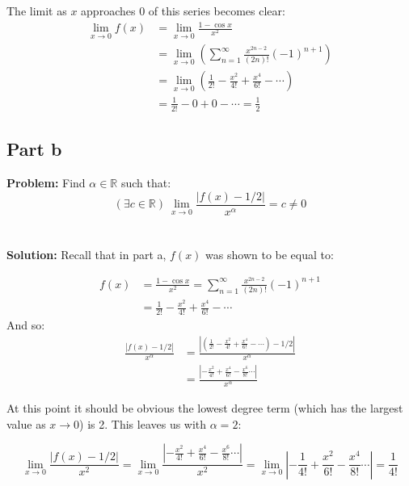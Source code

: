 \documentclass{article}
\begin{document}
The limit as $x$ approaches 0 of this series becomes clear:
\begin{align*}
\lim_{x\to 0}f(x)&=\lim_{x\to 0}\frac{1-\cos x}{x^2}\\
&=\lim_{x\to 0}\left(\sum_{n=1}^\infty\frac{x^{2n-2}}{(2n)!}(-1)^{n+1}\right)\\
&=\lim_{x\to 0}\left(\frac{1}{2!}-\frac{x^2}{4!}+\frac{x^4}{6!}-\cdots\right)\\
&=\frac{1}{2!}-0+0-\cdots=\frac{1}{2}
\end{align*}

\subsection*{Part b}
\textbf{Problem:} Find $\alpha\in\mathbb R$ such that:
$$(\exists c\in\mathbb R)\ \lim_{x\to0}\frac{|f(x)-1/2|}{x^\alpha}=c\not=0$$
\\\\
\textbf{Solution:} Recall that in part a, $f(x)$ was shown to be equal to:

\begin{align*}
  f(x)&=\frac{1-\cos x}{x^2}=\sum_{n=1}^\infty \frac{x^{2n-2}}{(2n)!}(-1)^{n+1}\\
  &=\frac{1}{2!}-\frac{x^2}{4!}+\frac{x^4}{6!}-\cdots
\end{align*}
And so:
\begin{align*}
  \frac{|f(x)-1/2|}{x^\alpha}&=\frac{\left|\left(\frac{1}{2!}-\frac{x^2}{4!}+\frac{x^4}{6!}-\cdots\right)-1/2\right|}{x^\alpha}\\
  &=\frac{\left|-\frac{x^2}{4!}+\frac{x^4}{6!}-\frac{x^6}{8!}\cdots\right|}{x^\alpha}
\end{align*}

At this point it should be obvious the lowest degree term (which has the largest value as $x\to 0$) is 2. This leaves us with $\alpha=2$:

$$\lim_{x\to0}\frac{|f(x)-1/2|}{x^2}=\lim_{x\to0}\frac{\left|-\frac{x^2}{4!}+\frac{x^4}{6!}-\frac{x^6}{8!}\cdots\right|}{x^2}=\lim_{x\to0}\left|-\frac{1}{4!}+\frac{x^2}{6!}-\frac{x^4}{8!}\cdots\right|=\frac{1}{4!}$$
\end{document}
